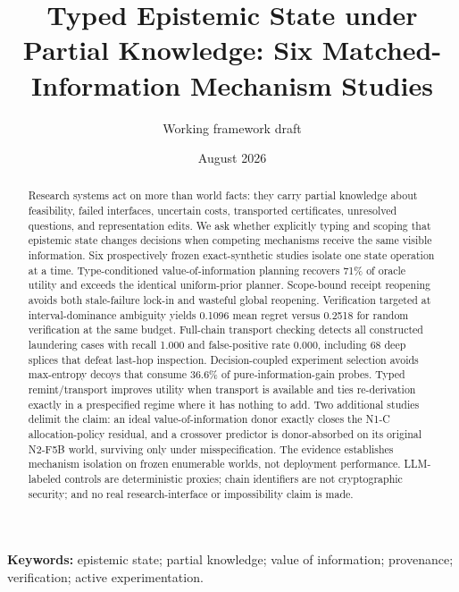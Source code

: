 \documentclass[11pt]{article}
\title{Typed Epistemic State under Partial Knowledge: Six Matched-Information Mechanism Studies}
\author{Working framework draft}
\date{August 2026}
\begin{document}
\maketitle
\begin{abstract}
Research systems act on more than world facts: they carry partial knowledge about feasibility, failed interfaces, uncertain costs, transported certificates, unresolved questions, and representation edits. We ask whether explicitly typing and scoping that epistemic state changes decisions when competing mechanisms receive the same visible information. Six prospectively frozen exact-synthetic studies isolate one state operation at a time. Type-conditioned value-of-information planning recovers 71\% of oracle utility and exceeds the identical uniform-prior planner. Scope-bound receipt reopening avoids both stale-failure lock-in and wasteful global reopening. Verification targeted at interval-dominance ambiguity yields 0.1096 mean regret versus 0.2518 for random verification at the same budget. Full-chain transport checking detects all constructed laundering cases with recall 1.000 and false-positive rate 0.000, including 68 deep splices that defeat last-hop inspection. Decision-coupled experiment selection avoids max-entropy decoys that consume 36.6\% of pure-information-gain probes. Typed remint/transport improves utility when transport is available and ties re-derivation exactly in a prespecified regime where it has nothing to add. Two additional studies delimit the claim: an ideal value-of-information donor exactly closes the N1-C allocation-policy residual, and a crossover predictor is donor-absorbed on its original N2-F5B world, surviving only under misspecification. The evidence establishes mechanism isolation on frozen enumerable worlds, not deployment performance. LLM-labeled controls are deterministic proxies; chain identifiers are not cryptographic security; and no real research-interface or impossibility claim is made.
\end{abstract}

\noindent\textbf{Keywords:} epistemic state; partial knowledge; value of information; provenance; verification; active experimentation.













\end{document}
